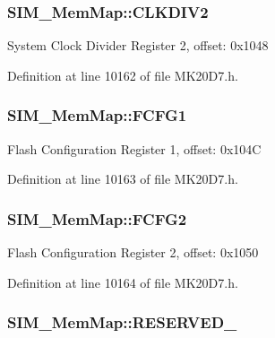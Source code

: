 \subsubsection[{\texorpdfstring{C\+L\+K\+D\+I\+V2}{CLKDIV2}}]{ S\+I\+M\+\_\+\+Mem\+Map\+::\+C\+L\+K\+D\+I\+V2}\hypertarget{struct_s_i_m___mem_map_a5596e21e5998efdcd3e29354487d8f2d}{}\label{struct_s_i_m___mem_map_a5596e21e5998efdcd3e29354487d8f2d}
System Clock Divider Register 2, offset\+: 0x1048 

Definition at line 10162 of file M\+K20\+D7.\+h.

\subsubsection[{\texorpdfstring{F\+C\+F\+G1}{FCFG1}}]{ S\+I\+M\+\_\+\+Mem\+Map\+::\+F\+C\+F\+G1}\hypertarget{struct_s_i_m___mem_map_a2b78edd16e6d046eb3399182216bf816}{}\label{struct_s_i_m___mem_map_a2b78edd16e6d046eb3399182216bf816}
Flash Configuration Register 1, offset\+: 0x104C 

Definition at line 10163 of file M\+K20\+D7.\+h.

\subsubsection[{\texorpdfstring{F\+C\+F\+G2}{FCFG2}}]{ S\+I\+M\+\_\+\+Mem\+Map\+::\+F\+C\+F\+G2}\hypertarget{struct_s_i_m___mem_map_afd105923b2815e01119a5bc195ceebd6}{}\label{struct_s_i_m___mem_map_afd105923b2815e01119a5bc195ceebd6}
Flash Configuration Register 2, offset\+: 0x1050 

Definition at line 10164 of file M\+K20\+D7.\+h.

\subsubsection[{\texorpdfstring{R\+E\+S\+E\+R\+V\+E\+D\+\_\+0}{RESERVED_0}}]{ S\+I\+M\+\_\+\+Mem\+Map\+::\+R\+E\+S\+E\+R\+V\+E\+D\+\_}\hypertarget{struct_s_i_m___mem_map_aa6f075e48cb371e0e12143af9570b4f4}{}\label{struct_s_i_m___mem_map_aa6f075e48cb371e0e12143af9570b4f4}


